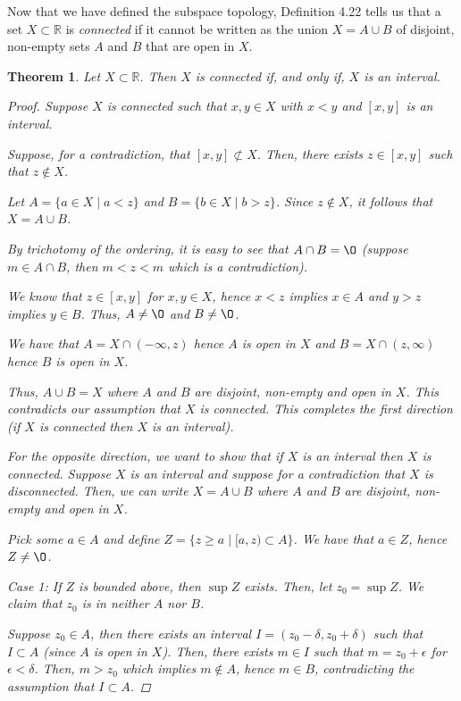 \documentclass[11pt]{article}
\newcommand{\bbR}{\mathbb{R}}
\renewcommand{\emptyset}{\O}
\newtheorem{theorem}{Theorem}[section]
\theoremstyle{definition}
\numberwithin{equation}{section}
\begin{document}
Now that we have defined the subspace topology, Definition 4.22 tells us that a set $X\subset \bbR$ is {\em connected} 
if it cannot be written as the union $X = A \cup B$ of disjoint, non-empty sets $A$ and $B$ that are open in $X$.

\begin{theorem}
Let $X\subset \bbR$. Then $X$ is connected if, and only if, $X$ is an interval.
\begin{proof}
Suppose $X$ is connected such that $x,y \in X$ with $x<y$ and $[x,y]$ is an interval. 

Suppose, for a contradiction, that $[x,y] \not \subset X$. Then, there exists $z \in [x,y]$ such that $z \notin X$.

Let $A=\{a\in X \mid a<z\}$ and $B=\{b\in X \mid b>z\}$. Since $z \notin X$, it follows that $X=A \cup B$. 

By trichotomy of the ordering, it is easy to see that $A\cap B = \emptyset$ (suppose $m\in A \cap B$, then $m<z<m$ which is a contradiction).  

We know that $z\in [x,y]$ for $x,y \in X$, hence $x<z$ implies $x \in A$ and $y>z$ implies $y \in B$. Thus, $A\neq \emptyset$ and $B \neq \emptyset$.

We have that $A = X \cap (-\infty,z)$ hence $A$ is open in $X$ and $B = X \cap (z,\infty)$ hence $B$ is open in $X$.

Thus, $A\cup B = X$ where $A$ and $B$ are disjoint, non-empty and open in $X$. This contradicts our assumption that $X$ is connected. This completes the first direction (if $X$ is connected then $X$ is an interval).

For the opposite direction, we want to show that if $X$ is an interval then $X$ is connected. Suppose $X$ is an interval and suppose for a contradiction that $X$ is disconnected. Then, we can write $X = A\cup B$ where $A$ and $B$ are disjoint, non-empty and open in $X$. 

Pick some $a\in A$ and define $Z=\{z \geq a \mid  [a,z)  \subset A \}$. We have that $a \in Z$, hence $Z \neq \emptyset$. 

Case 1: If $Z$ is bounded above, then $\sup Z$ exists. Then, let $z_0 = \sup Z$. We claim that $z_0$ is in neither $A$ nor $B$.

Suppose $z_0 \in A$, then there exists an interval $I=(z_0-\delta, z_0+\delta)$ such that $I \subset A$ (since $A$ is open in $X$). Then, there exists $m \in I$ such that $m=z_0+\epsilon$ for $\epsilon<\delta$. Then, $m>z_0$ which implies $m \notin A$, hence $m \in B$, contradicting the assumption that $I \subset A$.


\end{proof}
\end{theorem}
\end{document}
